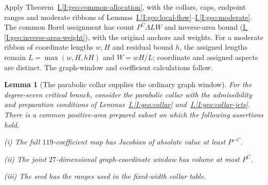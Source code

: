 \documentclass[11pt]{amsart}
\newtheorem{lemma}[theorem]{Lemma}
\theoremstyle{definition}
\theoremstyle{remark}
\numberwithin{equation}{section}
\newcommand{\partIref}[1]{\hyperref[I:#1]{I.\ref*{I:#1}}}
\newcommand{\partIeqref}[1]{\textup{(\partIref{#1})}}
\begin{document}
Apply Theorem~\partIref{geo:common-allocation}, with the collars, caps, endpoint ranges and moderate ribbons of Lemmas~\partIref{geo:local-flow}--\partIref{geo:moderate}. The common Borel assignment has count $P^C\Lambda LW$ and inverse-area bound \partIeqref{geo:inverse-area-weight}, with the original anchors and weights. For a moderate ribbon of coordinate lengths $w,H$ and residual bound $h$, the assigned lengths remain $L=\max(w,H,hH)$ and $W=wH/L$; coordinate and assigned aspects are distinct. The graph-window and coefficient calculations follow.

\begin{lemma}[The parabolic collar supplies the ordinary graph window]\label{low:78:s37g:graph-window}
For the degree-seven critical branch, consider the parabolic collar with the admissibility and preparation conditions of Lemmas~\partIref{geo:collar} and~\partIref{geo:collar-jets}. There is a common positive-area prepared subset on which the following assertions hold.

\noindent\textup{(i)} The full $119$-coefficient map has Jacobian of absolute value at least $P^{-C}$.

\noindent\textup{(ii)} The joint $27$-dimensional graph-coordinate window has volume at most $P^C$.

\noindent\textup{(iii)} The seed has the ranges used in the fixed-width collar table.
\end{lemma}
\end{document}
